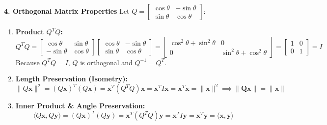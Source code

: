 \textbf{4. Orthogonal Matrix Properties}
Let $Q = \begin{bmatrix} \cos \theta & -\sin \theta \\ \sin \theta & \cos \theta \end{bmatrix}$:
\begin{enumerate}
    \item \textbf{Product $Q^T Q$:}
    \begin{equation*}
    Q^T Q = \begin{bmatrix} \cos\theta & \sin\theta \\ -\sin\theta & \cos\theta \end{bmatrix} \begin{bmatrix} \cos\theta & -\sin\theta \\ \sin\theta & \cos\theta \end{bmatrix} = \begin{bmatrix} \cos^2\theta + \sin^2\theta & 0 \\ 0 & \sin^2\theta + \cos^2\theta \end{bmatrix} = \begin{bmatrix} 1 & 0 \\ 0 & 1 \end{bmatrix} = I
    \end{equation*}
    Because $Q^T Q = I$, $Q$ is orthogonal and $Q^{-1} = Q^T$.
    \item \textbf{Length Preservation (Isometry):}
    \begin{equation*}
    \|Q\mathbf{x}\|^2 = (Q\mathbf{x})^T (Q\mathbf{x}) = \mathbf{x}^T (Q^T Q) \mathbf{x} = \mathbf{x}^T I \mathbf{x} = \mathbf{x}^T \mathbf{x} = \|\mathbf{x}\|^2 \implies \mathbf{\|Q\mathbf{x}\| = \|\mathbf{x}\|}
    \end{equation*}
    \item \textbf{Inner Product \& Angle Preservation:}
    \begin{equation*}
    \langle Q\mathbf{x}, Q\mathbf{y} \rangle = (Q\mathbf{x})^T (Q\mathbf{y}) = \mathbf{x}^T (Q^T Q) \mathbf{y} = \mathbf{x}^T I \mathbf{y} = \mathbf{x}^T \mathbf{y} = \langle \mathbf{x}, \mathbf{y} \rangle
    \end{equation*}
\end{enumerate}

